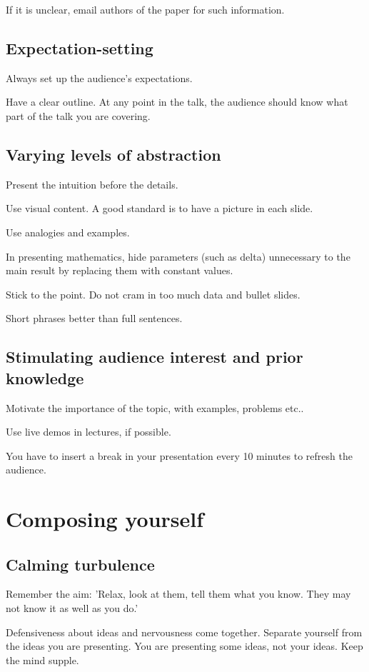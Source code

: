 \documentclass[oneside, article]{memoir}
\begin{document}
If it is unclear, email authors of the paper for such information.

\subsection{Expectation-setting}
Always set up the audience's expectations.

Have a clear outline. At any point in the talk, the audience should know what part of the talk you are covering.

\subsection{Varying levels of abstraction}
Present the intuition before the details.

Use visual content. A good standard is to have a picture in each slide.

Use analogies and examples.

In presenting mathematics, hide parameters (such as delta) unnecessary to the main result by replacing them with constant values.

Stick to the point. Do not cram in too much data and bullet slides.

Short phrases better than full sentences.

\subsection{Stimulating audience interest and prior knowledge}
Motivate the importance of the topic, with examples, problems etc..

Use live demos in lectures, if possible.

You have to insert a break in your presentation every 10 minutes to refresh the audience.

\section{Composing yourself}
\subsection{Calming turbulence}
Remember the aim: 'Relax, look at them, tell them what you know. They may not know it as well as you do.'

Defensiveness about ideas and nervousness come together. Separate yourself from the ideas you are presenting. You are presenting some ideas, not your ideas. Keep the mind supple.
\end{document}
